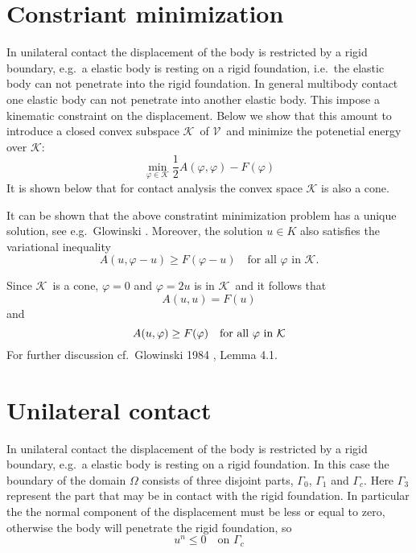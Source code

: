 \documentclass[12pt,a4paper]{article}
\numberwithin{equation}{section}
\numberwithin{table}{section}
\numberwithin{figure}{section}
\newcommand{\V}{\ensuremath{\mathcal{V}}}
\newcommand{\K}{\ensuremath{\mathcal{K}}}
\renewcommand{\phi}{\varphi}
\begin{document}
\section{Constriant minimization}

In unilateral contact the displacement of the body is restricted by a rigid boundary, e.g.\ a elastic body is resting on a rigid foundation, i.e.\ the elastic body can not penetrate into the rigid foundation. In general multibody contact one elastic body can not penetrate into another elastic body. This impose a kinematic constraint on the displacement. Below we show that this amount to introduce a closed convex subspace $\K$\ of $\V$\ and minimize the potenetial energy over $\K$:
\begin{equation}
  \label{ineq:potential_convex}
  \min_{\phi\in\K} \frac{1}{2}A(\phi,\phi) - F(\phi)
\end{equation}
It is shown below that for contact analysis the convex space $\K$ is also a cone.

It can be shown that the above constratint minimization problem has a unique solution, see e.g.\ Glowinski \cite{Glowinski1984:NonlinearVariational}. Moreover, the solution $u \in K$ also satisfies the variational inequality
\begin{equation}
  \label{ineq:varIneq}
  A(u,\phi-u) \ge F(\phi-u) \quad\text{for all $\phi$ in $\K$.}
\end{equation}

Since \K\ is a cone, $\phi = 0$ and $\phi = 2 u$ is in \K\ and it follows that
\begin{equation}
  \label{eq:varIneqSol}
  A(u,u) = F(u)
\end{equation}
and
\begin{equation}
  \label{ineq:varIneqSol}
  A(u,\phi) \ge F(\phi) \quad\text{for all $\phi$ in \K}
\end{equation}
For further discussion cf.\ Glowinski 1984 \cite{Glowinski1984:NonlinearVariational}, Lemma 4.1.

\section{Unilateral contact}

In unilateral contact the displacement of the body is restricted by a rigid boundary, e.g.\ a elastic body is resting on a rigid foundation.  In this case the boundary of the domain $\Omega$ consists of three disjoint parts, $\Gamma_0$, $\Gamma_1$ and $\Gamma_c$. Here $\Gamma_3$ represent the part that may be in contact with the rigid foundation. In particular the the normal component of the displacement must be less or equal to zero, otherwise the body will penetrate the rigid foundation, so
\begin{equation}
  u^n \le 0 \quad\text{on $\Gamma_c$}
\end{equation}
\end{document}
